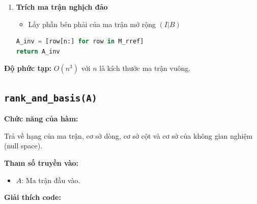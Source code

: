 \documentclass[a4paper,12pt]{report}
\begin{document}
\begin{enumerate}
\begin{lstlisting}[language=Python, caption={Gauss-Jordan}]
M_rref = backward_elimination(M, pivot_cols)
\end{lstlisting}

\item \textbf{Trích ma trận nghịch đảo}

\begin{itemize}
    \item Lấy phần bên phải của ma trận mở rộng $(I|B)$
\end{itemize}

\begin{lstlisting}[language=Python, caption={Lấy ma trận nghịch đảo}]
A_inv = [row[n:] for row in M_rref]
return A_inv
\end{lstlisting}

\end{enumerate}
\textbf{Độ phức tạp:} $O(n^3)$ với $n$ là kích thước ma trận vuông.

\subsection[rank\_and\_basis(A)]{\texttt{rank\_and\_basis(A)}}

\textbf{Chức năng của hàm:}

Trả về hạng của ma trận, cơ sở dòng, cơ sở cột và cơ sở của không gian nghiệm (null space).

\smallskip

\noindent\textbf{Tham số truyền vào:}
\begin{itemize}
    \item $A$: Ma trận đầu vào.
\end{itemize}

\smallskip

\noindent\textbf{Giải thích code:}
\end{document}
